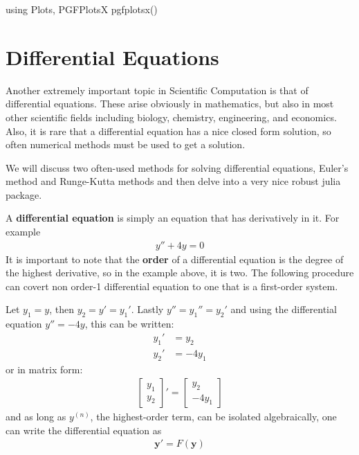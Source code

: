 
\begin{jlcode}[diffeq]
using Plots, PGFPlotsX
pgfplotsx()
\end{jlcode}

\chapter{Differential Equations} \label{ch:diffeq}

Another extremely important topic in Scientific Computation is that of differential equations.  These arise obviously in mathematics, but also in most other scientific fields including biology, chemistry, engineering, and economics.  Also, it is rare that a differential equation has a nice closed form solution, so often numerical methods must be used to get a solution. 

We will discuss two often-used methods for solving differential equations, Euler's method and Runge-Kutta methods and then delve into a very nice robust julia package.

A \textbf{differential equation} is simply an equation that has derivatively in it.  For example
\begin{align*}
y'' + 4 y = 0
\end{align*}
It is important to note that the \textbf{order} of a differential equation is the degree of the highest derivative, so in the example above, it is two.  The following procedure can covert non order-1 differential equation to one that is a first-order system. 

Let $y_1 = y$, then $y_2 = y' = y_1'$.  Lastly $y'' = y_1'' = y_2'$ and using the differential equation $y''=-4y$, this can be written:
\begin{align*}
y_1' & = y_2  \\
y_2' & = -4y_1
\end{align*}
or in matrix form:
\begin{align*}
\begin{bmatrix}
y_1 \\ y_2 
\end{bmatrix}' = \begin{bmatrix}
y_2 \\ -4y_1
\end{bmatrix}
\end{align*}
and as long as $y^{(n)}$, the highest-order term, can be isolated algebraically, one can write the differential equation as
\begin{align*}
\mathbf{y}' = F(\mathbf{y})
\end{align*}


